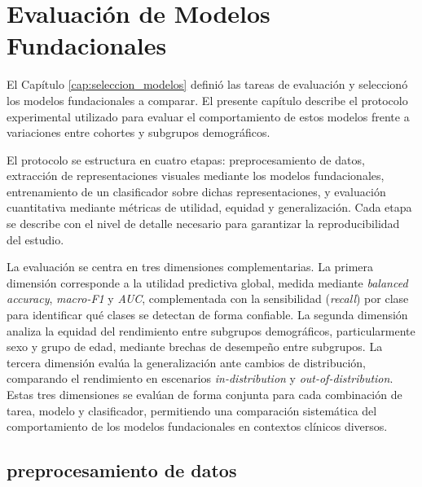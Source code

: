 ﻿%


\chapter{Evaluación de Modelos Fundacionales}
\label{cap:evaluacion_modelos}

El Capítulo \ref{cap:seleccion_modelos} definió las tareas de evaluación y seleccionó los modelos fundacionales a comparar. El presente capítulo describe el protocolo experimental utilizado para evaluar el comportamiento de estos modelos frente a variaciones entre cohortes y subgrupos demográficos.

El protocolo se estructura en cuatro etapas: preprocesamiento de datos, extracción de representaciones visuales mediante los modelos fundacionales, entrenamiento de un clasificador sobre dichas representaciones, y evaluación cuantitativa mediante métricas de utilidad, equidad y generalización. Cada etapa se describe con el nivel de detalle necesario para garantizar la reproducibilidad del estudio.

La evaluación se centra en tres dimensiones complementarias. La primera dimensión corresponde a la utilidad predictiva global, medida mediante \textit{balanced accuracy}, \textit{macro-F1} y \textit{AUC}, complementada con la sensibilidad (\textit{recall}) por clase para identificar qué clases se detectan de forma confiable. La segunda dimensión analiza la equidad del rendimiento entre subgrupos demográficos, particularmente sexo y grupo de edad, mediante brechas de desempeño entre subgrupos. La tercera dimensión evalúa la generalización ante cambios de distribución, comparando el rendimiento en escenarios \textit{in-distribution} y \textit{out-of-distribution}. Estas tres dimensiones se evalúan de forma conjunta para cada combinación de tarea, modelo y clasificador, permitiendo una comparación sistemática del comportamiento de los modelos fundacionales en contextos clínicos diversos.

\section{preprocesamiento de datos}
\label{sec:preparacion_datos}

